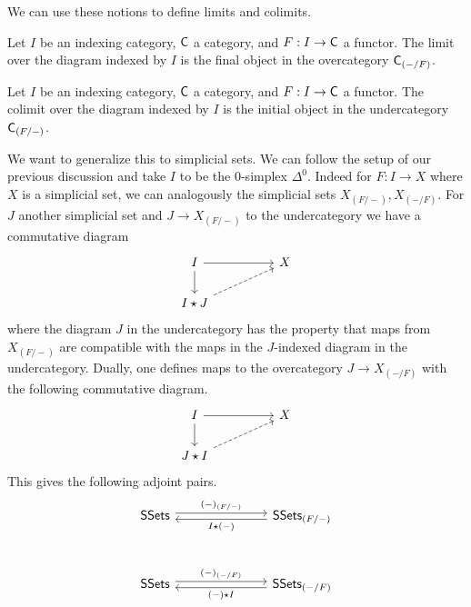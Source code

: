 We can use these notions to define limits and colimits. 
\begin{definition}[Limit]
  Let $I$ be an indexing category, $\mathsf{C}$ a category, and $F:I\to \mathsf{C}$ a functor. The limit over the diagram indexed by $I$ is the final object in the overcategory $\mathsf{C}_{(-/F)}$.
\end{definition}
\begin{definition}[Colimit]
  Let $I$ be an indexing category, $\mathsf{C}$ a category, and $F:I\to \mathsf{C}$ a functor. The colimit over the diagram indexed by $I$ is the initial object in the undercategory $\mathsf{C}_{(F/-)}$. 
\end{definition}
We want to generalize this to simplicial sets. We can follow the setup of our previous discussion and take $I$ to be the 0-simplex $\Delta^{0}$. Indeed for $F:I\to X$ where $X$ is a simplicial set, we can analogously the simplicial sets $X_{(F/-)}, X_{(-/F)}$. For $J$ another simplicial set and $J\to X_{(F/-)}$ to the undercategory we have a commutative diagram
$$%
\begin{tikzcd}
	I && X \\
	{I\star J}
	\arrow[dashed, from=2-1, to=1-3]
	\arrow[from=1-1, to=1-3]
	\arrow[from=1-1, to=2-1]
\end{tikzcd}$$
where the diagram $J$ in the undercategory has the property that maps from $X_{(F/-)}$ are compatible with the maps in the $J$-indexed diagram in the undercategory. Dually, one defines maps to the overcategory $J\to X_{(-/F)}$ with the following commutative diagram. 
$$%
\begin{tikzcd}
	I && X \\
	{J\star I}
	\arrow[dashed, from=2-1, to=1-3]
	\arrow[from=1-1, to=1-3]
	\arrow[from=1-1, to=2-1]
\end{tikzcd}$$ 
This gives the following adjoint pairs. 
$$%
\begin{tikzcd}
	\SSets &&& {\SSets_{(F/-)}} \\
	\\
	\SSets &&& {\SSets_{(-/F)}}
	\arrow["{(-)_{(F/-)}}", shift left, from=1-1, to=1-4]
	\arrow["{I\star(-)}", shift left, from=1-4, to=1-1]
	\arrow["{(-)_{(-/F)}}", shift left, from=3-1, to=3-4]
	\arrow["{(-)\star I}", shift left, from=3-4, to=3-1]
\end{tikzcd}$$
